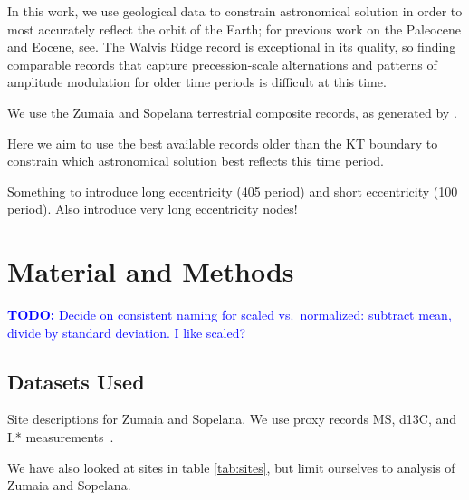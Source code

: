 \documentclass[draft]{agujournal2019}
\newcommand{\ijk}{\textcolor{blue}}
\begin{document}
In this work, we use geological data to constrain astronomical solution in order to most accurately reflect the orbit of the Earth; for previous work on the Paleocene and Eocene, see.
The Walvis Ridge record is exceptional in its quality, so finding comparable records that capture precession-scale alternations and patterns of amplitude modulation for older time periods is difficult at this time.

We use the Zumaia and Sopelana terrestrial composite records, as generated by .

Here we aim to use the best available records older than the \gls{KT} boundary to constrain which astronomical solution best reflects this time period.

Something to introduce long eccentricity (\qty{405}{\kiloyear} period) and short eccentricity (\qty{100}{\kiloyear} period).
Also introduce very long eccentricity nodes!



\section{Material and Methods}\label{sec:mm}

\ijk{\textbf{TODO:} Decide on consistent naming for scaled vs.\ normalized: subtract mean, divide by standard deviation. I like scaled?}

\subsection{Datasets Used}\label{sec:data}

Site descriptions for Zumaia and Sopelana.
We use proxy records \gls{MS}, \gls{d13C}, and \gls{L*} measurements~\cite{Batenburg2012,Batenburg2014}.

We have also looked at sites in table \cref{tab:sites}, but limit ourselves to analysis of Zumaia and Sopelana.
\end{document}
